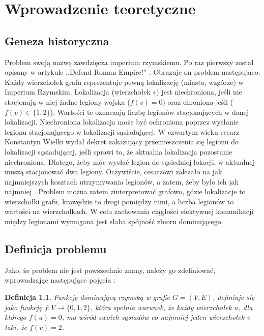 \chapter{Wprowadzenie teoretyczne}

\section{Geneza historyczna}
Problem swoją nazwę zawdzięcza imperium rzymskiemu. Po raz pierwszy został opisany w artykule ,,Defend Roman Empire!'' \cite{defendRomanEmpire}.
Obrazuje on problem następująco: Każdy wierzchołek grafu reprezentuje pewną lokalizację (miasto, wzgórze) w Imperium Rzymskim. Lokalizacja (wierzchołek $v$) jest niechroniona, jeśli nie stacjonują w niej żadne legiony wojska ($f(v) = 0$) oraz chroniona jeśli ($f(v) \in \{1,2\} $). Wartości te oznaczają liczbę legionów stacjonujących w danej lokalizacji. Niechroniona lokalizacja może być ochroniona poprzez wysłanie legionu stacjonującego w lokalizacji sąsiadującej. W czwartym wieku cesarz Konstantyn Wielki wydał dekret zakazujący przemieszczenia się legionu do lokalizacji sąsiadującej, jeśli sprawi to, że aktualna lokalizacja pozostanie niechroniona. Dlatego, żeby móc wysłać legion do sąsiedniej lokacji, w aktualnej muszą stacjonować dwa legiony. Oczywiście, cesarzowi zależało na jak najmniejszych kosztach utrzymywania legionów, a zatem, żeby było ich jak najmniej \cite{theoryWCRDF}. Problem można zatem zinterpretować grafowo, gdzie lokalizacje to wierzchołki grafu, krawędzie to drogi pomiędzy nimi, a liczba legionów to wartości na wierzchołkach. W celu zachowania ciągłości efektywnej komunikacji między legionami wymagana jest słaba spójność zbioru dominującego.

\section{Definicja problemu}
Jako, że problem nie jest powszechnie znany, należy go zdefiniować, wprowadzając następujące pojęcia \cite{theoryWCRDF}:

\newtheorem{definition}{Definicja}

\begin{definition}
    Funkcję dominującą rzymską w grafie $G = (V, E)$, definiuje się jako funkcję $f: V \to \{0,1,2\}$, która spełnia warunek, że każdy wierzchołek $u$, dla którego $f(u) = 0$, ma wśród swoich sąsiadów co najmniej jeden wierzchołek $v$ taki, że $f(v) = 2$.
\end{definition}

